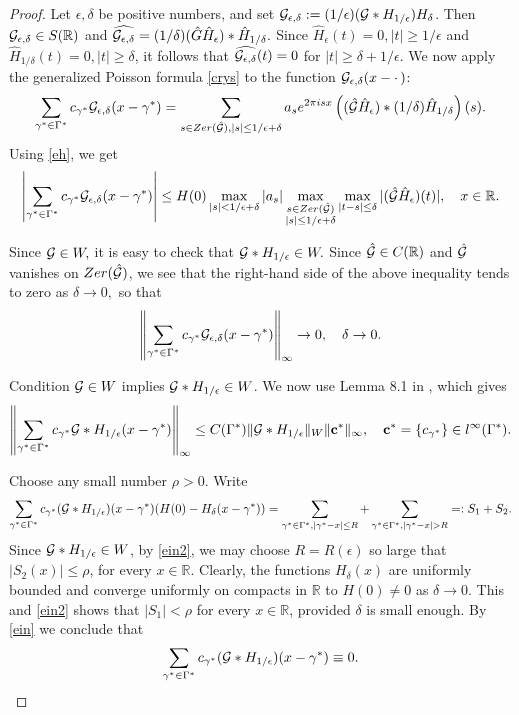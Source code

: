 \documentclass[12pt]{amsart}
\numberwithin{equation}{section}
\newcommand{\R}{{\mathbb R}} \newcommand{\Q}{{\mathbb Q}} \newcommand{\Z}{{\mathbb Z}} \newcommand{\N}{{\mathbb N}}
\newcommand{\Zer}{{\rm Zer}}
\begin{document}
\begin{proof}
Let $\epsilon, \delta$ be positive numbers, and set $\mathcal{G}_{\epsilon,\delta}:=(1/\epsilon)(\mathcal{G}\ast H_{1/\epsilon})H_\delta $. Then $\Ff_{\epsilon,\delta}\in S(\R)$ and $\widehat{\mathcal{G}_{\epsilon,\delta}}=(1/\delta)(\hat G\hat H_\epsilon)\ast \hat H_{1/\delta}.$ Since $\hat H_\epsilon(t)=0, |t|\geq 1/\epsilon$ and 
$\hat H_{1/\delta}(t)=0, |t|\geq\delta$, it follows that $\widehat{\mathcal{G}_{\epsilon,\delta}}(t)=0$
for $|t|\geq \delta+1/\epsilon.$
We now apply the generalized Poisson formula \eqref{crys} to the function $\mathcal{G}_{\epsilon,\delta}(x-\cdot\,)$:
$$\sum_{\gamma^\ast\in \Gamma^\ast}c_{\gamma^\ast}\Ff_{\epsilon,\delta}(x-\gamma^\ast)=
\sum_{s\in \Zer(\hat\Ff), |s|\leq 1/\epsilon+\delta}a_s e^{2\pi i sx}\left((\hat \Ff\hat H_{\epsilon})\ast (1/\delta)\hat H_{1/\delta}\right)(s).$$
Using \eqref{eh}, we get 
$$\left|\sum_{\gamma^\ast\in \Gamma^\ast}c_{\gamma^\ast}\Ff_{\epsilon,\delta}(x-\gamma^\ast)\right|\leq H(0) \max_{|s|<1/\epsilon+\delta}|a_s|\max\limits_{\substack{s\in \Zer(\hat\Ff) \\ |s|\leq 1/\epsilon+\delta}}\max_{|t-s|\leq\delta}
|(\hat \Ff\hat H_{\epsilon})(t)|,\quad x\in\R.$$

Since $\mathcal{G}\in W,$ it is easy to check that $\mathcal{G}\ast H_{1/\epsilon}\in W.$
Since $\hat\Ff\in C(\R)$ and  $\hat{\mathcal{G}}$ vanishes on $\Zer(\hat\Ff)$, we see that the right-hand side of the above inequality tends to zero as $\delta\to 0,$ 
so that
\begin{equation}\label{ein}
\left\| \sum_{\gamma^\ast\in \Gamma^\ast}c_{\gamma^\ast}\Ff_{\epsilon,\delta}(x-\gamma^\ast) \right\|_\infty\to0,\quad \delta\to0.  
\end{equation}


Condition $\mathcal{G}\in W$ implies $\mathcal{G}\ast H_{1/\epsilon}\in W$. We now use  Lemma 8.1 in \cite{uz}, which gives
\begin{equation}\label{ein2}\left\| \sum_{\gamma^\ast\in \Gamma^\ast}c_{\gamma^\ast}\Ff\ast H_{1/\epsilon}(x-\gamma^\ast) \right\|_\infty\leq C(\Gamma^\ast)\|\Ff\ast H_{1/\epsilon}\|_W\|{\bf c^\ast}\|_\infty,\quad {\bf c^\ast}=\{c_{\gamma^\ast}\}\in l^\infty(\Gamma^\ast).\end{equation}


Choose any small number $\rho>0$.
Write 
$$\sum_{\gamma^\ast\in \Gamma^\ast}c_{\gamma^\ast}(\Ff\ast H_{1/\epsilon})(x-\gamma^\ast) (H(0)-H_\delta(x-\gamma^\ast))=\sum_{\gamma^\ast\in\Gamma^\ast, |\gamma^\ast-x|\leq R} + \sum_{\gamma^\ast\in\Gamma^\ast, |\gamma^\ast-x|> R}=:S_1+S_2.$$Since $\mathcal{G}\ast H_{1/\epsilon}\in W$, by \eqref{ein2}, we may choose $R=R(\epsilon)$ so large that $|S_2(x)|\leq\rho$, for every $x\in\R.$ Clearly, the functions $H_\delta(x)$ are uniformly bounded and converge uniformly on compacts in $\R$ to $H(0)\ne0$ as $\delta\to 0.$ This and \eqref{ein2} shows that  $|S_1|<\rho$ for every $x\in\R$, provided $\delta$ is small enough.
By \eqref{ein} we conclude that
\begin{equation}\label{eqve}\sum_{\gamma^\ast\in \Gamma^\ast}c_{\gamma^\ast}(\Ff\ast H_{1/\epsilon})(x-\gamma^\ast)\equiv 0.
\end{equation}


\end{proof}
\end{document}
